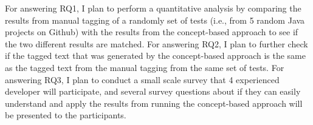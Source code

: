 For answering RQ1, I plan to perform a quantitative analysis by comparing the results from manual tagging of a randomly set of tests (i.e., from 5 random Java projects on Github) with the results from the concept-based approach to see if the two different results are matched.
%
For answering RQ2, I plan to further check if the tagged text that was generated by the concept-based approach is the same as the tagged text from the manual tagging from the same set of tests.
%
For answering RQ3, I plan to conduct a small scale survey that 4 experienced developer will participate, and several survey questions about if they can easily understand and apply the results from running the concept-based approach will be presented to the participants.


